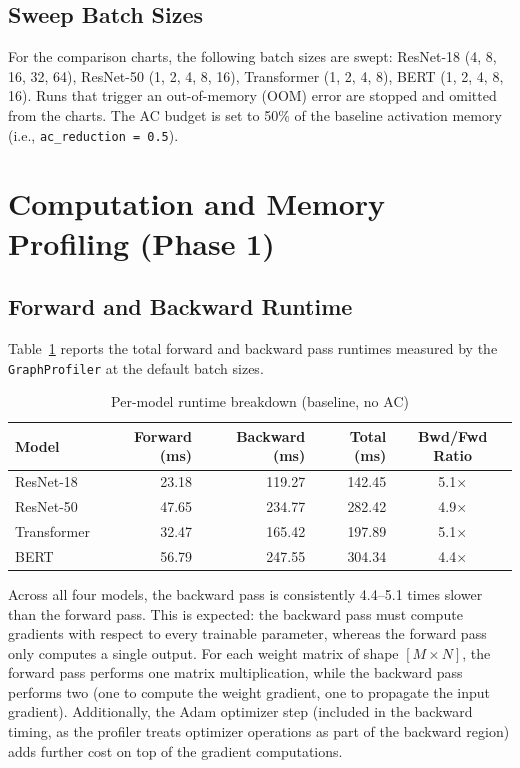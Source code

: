 \documentclass[11pt]{article}
\begin{document}
\subsection{Sweep Batch Sizes}

For the comparison charts, the following batch sizes are swept:
ResNet-18 (4, 8, 16, 32, 64),
ResNet-50 (1, 2, 4, 8, 16),
Transformer (1, 2, 4, 8),
BERT (1, 2, 4, 8, 16).
Runs that trigger an out-of-memory (OOM) error are stopped and omitted from
the charts. The AC budget is set to 50\% of the baseline activation memory
(i.e., \texttt{ac\_reduction = 0.5}).

\section{Computation and Memory Profiling (Phase 1)}

\subsection{Forward and Backward Runtime}

Table~\ref{tab:runtime} reports the total forward and backward pass runtimes
measured by the \texttt{GraphProfiler} at the default batch sizes.

\begin{table}[H]
\centering
\caption{Per-model runtime breakdown (baseline, no AC)}
\label{tab:runtime}
\begin{tabular}{lrrrc}
\toprule
\textbf{Model} & \textbf{Forward (ms)} & \textbf{Backward (ms)} & \textbf{Total (ms)} & \textbf{Bwd/Fwd Ratio} \\
\midrule
ResNet-18   &  23.18 & 119.27 & 142.45 & 5.1$\times$ \\
ResNet-50   &  47.65 & 234.77 & 282.42 & 4.9$\times$ \\
Transformer &  32.47 & 165.42 & 197.89 & 5.1$\times$ \\
BERT        &  56.79 & 247.55 & 304.34 & 4.4$\times$ \\
\bottomrule
\end{tabular}
\end{table}

Across all four models, the backward pass is consistently 4.4--5.1 times
slower than the forward pass. This is expected: the backward pass must
compute gradients with respect to every trainable parameter, whereas the
forward pass only computes a single output. For each weight matrix of shape
$[M \times N]$, the forward pass performs one matrix multiplication, while
the backward pass performs two (one to compute the weight gradient, one to
propagate the input gradient). Additionally, the Adam optimizer step
(included in the backward timing, as the profiler treats optimizer
operations as part of the backward region) adds further cost on top of the
gradient computations.
\end{document}

